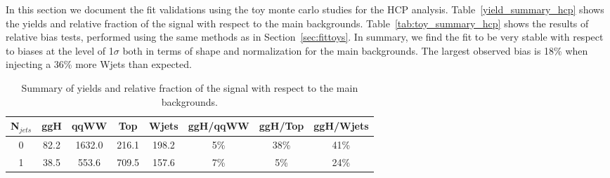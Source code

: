 In this section we document the fit validations using the toy 
monte carlo studies for the HCP analysis. 
Table~\ref{yield_summary_hcp} shows the yields and relative fraction of the signal with respect to the main backgrounds. 
Table~\ref{tab:toy_summary_hcp} shows the results of relative bias tests, performed using 
the same methods as in Section~\ref{sec:fittoys}.
In summary, we find the fit to be very stable with respect to biases at the 
level of 1$\sigma$ both in terms of shape and normalization for the main backgrounds. 
The largest observed bias is 18\% when injecting a 36\% more Wjets than expected.

\begin{table}
\begin{center}
\begin{tabular}{c | c c c c | c c c }
\hline
N$_{jets}$ & ggH & qqWW & Top & Wjets & ggH/qqWW & ggH/Top & ggH/Wjets \\
\hline
0 & 82.2 & 1632.0 & 216.1 & 198.2 & 5\% & 38\% & 41\% \\
1 & 38.5 &  553.6 & 709.5 & 157.6 & 7\% & 5\%  & 24\% \\
\hline
\end{tabular}
\caption{Summary of yields and relative fraction of the signal with respect to the main backgrounds.}
\label{tab:yield_summary_hcp}
\end{center}
\end{table}

